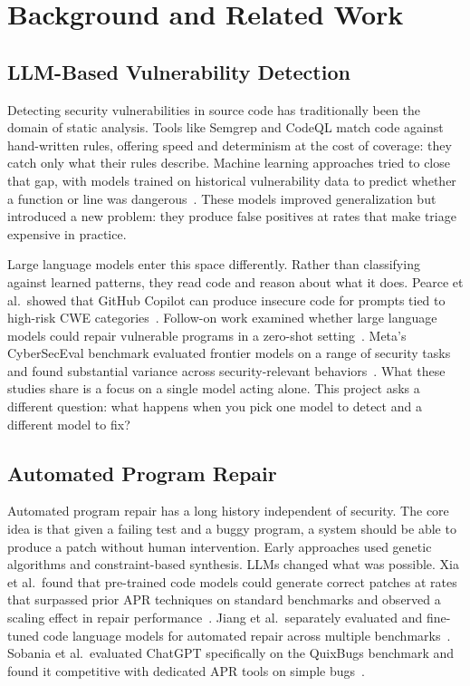 \documentclass[12pt]{article}
\begin{document}
\section{Background and Related Work}
\label{sec:background}

\subsection{LLM-Based Vulnerability Detection}

Detecting security vulnerabilities in source code has traditionally been the
domain of static analysis. Tools like Semgrep and CodeQL match code against
hand-written rules, offering speed and determinism at the cost of coverage:
they catch only what their rules describe. Machine learning approaches tried to
close that gap, with models trained on historical vulnerability data to predict
whether a function or line was dangerous~\cite{fu2022linevul, thapa2022transformer, li2023sast}.
These models improved generalization but introduced a new problem: they produce
false positives at rates that make triage expensive in practice.

Large language models enter this space differently. Rather than classifying
against learned patterns, they read code and reason about what it does. Pearce
et al.\ showed that GitHub Copilot can produce insecure code for prompts tied
to high-risk CWE categories~\cite{pearce2022copilot}. Follow-on work examined
whether large language models could repair vulnerable programs in a zero-shot
setting~\cite{pearce2023repair}. Meta's CyberSecEval benchmark evaluated
frontier models on a range of security tasks and found substantial variance
across security-relevant behaviors~\cite{cyberSecEval}.
What these studies share is a focus on a single model acting alone. This
project asks a different question: what happens when you pick one model to
detect and a different model to fix?

\subsection{Automated Program Repair}

Automated program repair has a long history independent of security. The
core idea is that given a failing test and a buggy program, a system should
be able to produce a patch without human intervention. Early approaches used
genetic algorithms and constraint-based synthesis. LLMs changed what was
possible. Xia et al.\ found that pre-trained code models could generate
correct patches at rates that surpassed prior APR techniques on standard
benchmarks and observed a scaling effect in repair performance~\cite{xia2023apr}.
Jiang et al.\ separately evaluated and fine-tuned code language models for
automated repair across multiple benchmarks~\cite{jiang2023apr}. Sobania et al.\
evaluated ChatGPT specifically on the QuixBugs benchmark and found it
competitive with dedicated APR tools on simple bugs~\cite{sobania2023chatgpt}.
\end{document}

